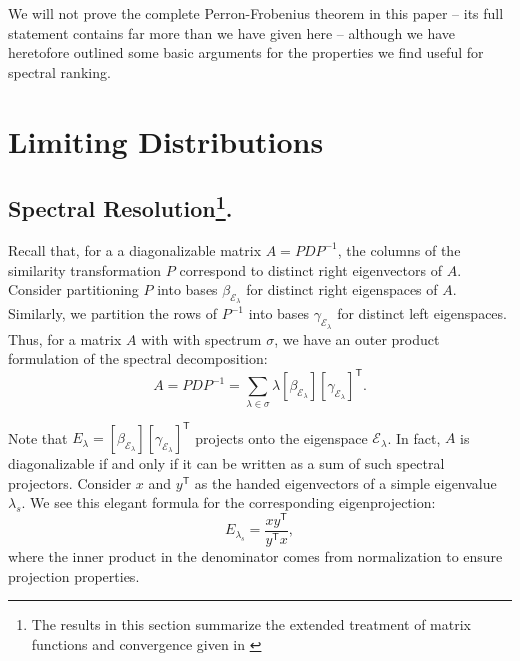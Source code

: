 \documentclass[11pt,letterpaper]{amsart}
\newcommand{\transpose}[1]{#1^{\mathsf{T}}}
\newcommand{\inverse}[1]{#1^{-1}}
\begin{document}
We will not prove the complete Perron-Frobenius theorem in this paper -- its
full statement contains far more than we have given here -- although we have
heretofore outlined some basic arguments for the properties we find useful for
spectral ranking.




\section{Limiting Distributions}


\subsection{Spectral Resolution\protect\footnote{The results in this section
    summarize the extended treatment of matrix functions and convergence given
    in \cite{meyerMatrixAnalysisApplied2000}}.}
Recall that, for a a diagonalizable matrix $A=PD\inverse{P}$, the columns of the
similarity transformation $P$ correspond to distinct right eigenvectors of $A$.
Consider partitioning $P$ into bases $\beta_{\mathcal{E}_\lambda}$ for distinct
right eigenspaces of $A$. Similarly, we partition the rows of $\inverse{P}$ into
bases $\gamma_{\mathcal{E}_\lambda}$ for distinct left eigenspaces. Thus, for a
matrix $A$ with with spectrum $\sigma$, we have an outer product formulation of
the spectral decomposition:
\begin{equation}
  \label{eqn:spectral_decomposition}
  A = PD\inverse{P} = \sum_{\lambda\in\sigma}{\lambda [\beta_{\mathcal{E}_\lambda}]\transpose{[\gamma_{\mathcal{E}_\lambda}]}}.
\end{equation}

Note that
$E_\lambda =
[\beta_{\mathcal{E}_\lambda}]\transpose{[\gamma_{\mathcal{E}_\lambda}]}$
projects onto the eigenspace $\mathcal{E}_\lambda$. In fact, $A$ is
diagonalizable if and only if it can be written as a sum of such spectral
projectors. Consider $x$ and $\transpose{y}$ as the handed eigenvectors of a
simple eigenvalue $\lambda_s$. We see this elegant formula for the corresponding
eigenprojection:
\begin{equation}
  \label{eqn:simple_eigenprojection}
  E_{\lambda_s} = \frac{x \transpose{y}}{\transpose{y} x},
\end{equation}
where the inner product in the denominator comes from normalization to ensure projection properties.
\end{document}
